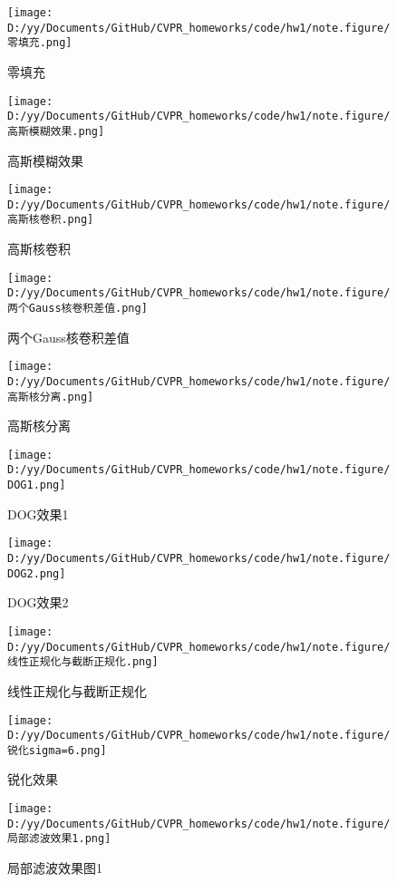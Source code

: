 \documentclass[12pt, a4paper, oneside]{ctexart}
\begin{document}
\begin{figure}[htbp]
    \centering
    \texttt{[image: D:/yy/Documents/GitHub/CVPR\_homeworks/code/hw1/note.figure/零填充.png]}
    \caption{零填充\label{零填充}}
\end{figure}
\begin{figure}[htbp]
    \centering
    \texttt{[image: D:/yy/Documents/GitHub/CVPR\_homeworks/code/hw1/note.figure/高斯模糊效果.png]}
    \caption{高斯模糊效果\label{高斯模糊效果}}
\end{figure}
\begin{figure}[htbp]
    \centering
    \texttt{[image: D:/yy/Documents/GitHub/CVPR\_homeworks/code/hw1/note.figure/高斯核卷积.png]}
    \caption{高斯核卷积\label{高斯核卷积}}
\end{figure}
\begin{figure}[htbp]
    \centering
    \texttt{[image: D:/yy/Documents/GitHub/CVPR\_homeworks/code/hw1/note.figure/两个Gauss核卷积差值.png]}
    \caption{两个Gauss核卷积差值\label{两个Gauss核卷积差值}}
\end{figure}
\begin{figure}[htbp]
    \centering
    \texttt{[image: D:/yy/Documents/GitHub/CVPR\_homeworks/code/hw1/note.figure/高斯核分离.png]}
    \caption{高斯核分离\label{高斯核分离}}
\end{figure}
\begin{figure}[htbp]
    \centering
    \texttt{[image: D:/yy/Documents/GitHub/CVPR\_homeworks/code/hw1/note.figure/DOG1.png]}
    \caption{DOG效果1\label{DOG效果图1}}
\end{figure}
\begin{figure}[htbp]
    \centering
    \texttt{[image: D:/yy/Documents/GitHub/CVPR\_homeworks/code/hw1/note.figure/DOG2.png]}
    \caption{DOG效果2\label{DOG效果图2}}
\end{figure}
\begin{figure}[htbp]
    \centering
    \texttt{[image: D:/yy/Documents/GitHub/CVPR\_homeworks/code/hw1/note.figure/线性正规化与截断正规化.png]}
    \caption{线性正规化与截断正规化\label{线性正规化与截断正规化}}
\end{figure}
\begin{figure}[htbp]
    \centering
    \texttt{[image: D:/yy/Documents/GitHub/CVPR\_homeworks/code/hw1/note.figure/锐化sigma=6.png]}
    \caption{锐化效果\label{锐化效果}}
\end{figure}
\begin{figure}[htbp]
    \centering
    \texttt{[image: D:/yy/Documents/GitHub/CVPR\_homeworks/code/hw1/note.figure/局部滤波效果1.png]}
    \caption{局部滤波效果图1\label{局部滤波1}}
\end{figure}
\end{document}
